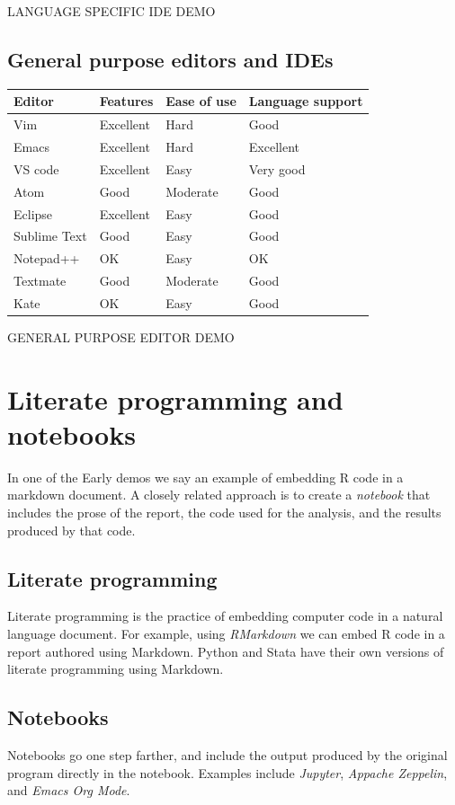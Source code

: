 \documentclass[]{book}
\begin{document}
LANGUAGE SPECIFIC IDE DEMO

\subsection{General purpose editors and
IDEs}\label{general-purpose-editors-and-ides}

\begin{longtable}[]{@{}llll@{}}
\toprule
Editor & Features & Ease of use & Language support\tabularnewline
\midrule
\endhead
Vim & Excellent & Hard & Good\tabularnewline
Emacs & Excellent & Hard & Excellent\tabularnewline
VS code & Excellent & Easy & Very good\tabularnewline
Atom & Good & Moderate & Good\tabularnewline
Eclipse & Excellent & Easy & Good\tabularnewline
Sublime Text & Good & Easy & Good\tabularnewline
Notepad++ & OK & Easy & OK\tabularnewline
Textmate & Good & Moderate & Good\tabularnewline
Kate & OK & Easy & Good\tabularnewline
\bottomrule
\end{longtable}

GENERAL PURPOSE EDITOR DEMO

\section{Literate programming and
notebooks}\label{literate-programming-and-notebooks}

In one of the Early demos we say an example of embedding R code in a
markdown document. A closely related approach is to create a
\emph{notebook} that includes the prose of the report, the code used for
the analysis, and the results produced by that code.

\subsection{Literate programming}\label{literate-programming}

Literate programming is the practice of embedding computer code in a
natural language document. For example, using \emph{RMarkdown} we can
embed R code in a report authored using Markdown. Python and Stata have
their own versions of literate programming using Markdown.

\subsection{Notebooks}\label{notebooks}

Notebooks go one step farther, and include the output produced by the
original program directly in the notebook. Examples include
\emph{Jupyter}, \emph{Appache Zeppelin}, and \emph{Emacs Org Mode}.
\end{document}
